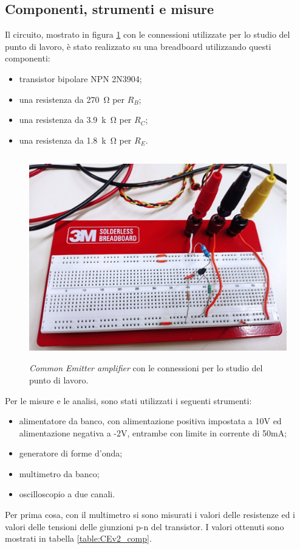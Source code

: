 \documentclass{report}
\begin{document}
\subsection{Componenti, strumenti e misure} 
Il circuito, mostrato in figura \ref{figura:fotoCEv2_pl} con le connessioni utilizzate per lo studio del punto di lavoro, è stato realizzato su una breadboard utilizzando questi componenti:
\begin{itemize}
\item transistor bipolare NPN 2N3904;
\item una resistenza da \SI{270}{\ohm} per $R_B$;
\item una resistenza da \SI{3.9}{k\ohm} per $R_C$;
\item una resistenza da \SI{1.8}{k\ohm} per $R_E$.
\end{itemize}
\begin{figure}[h]
\centering
\includegraphics[height=8.9cm]{immagini/fotoCEv2_pl}
\caption{\textit{Common Emitter amplifier} con le connessioni per lo studio del punto di lavoro.}
\label{figura:fotoCEv2_pl}
\end{figure}
Per le misure e le analisi, sono stati utilizzati i seguenti strumenti:
\begin{itemize}
\item alimentatore da banco, con alimentazione positiva impostata a 10V ed alimentazione negativa a -2V, entrambe con limite in corrente di 50mA;
\item generatore di forme d'onda;
\item multimetro da banco;
\item oscilloscopio a due canali.
\end{itemize}
Per prima cosa, con il multimetro si sono misurati i valori delle resistenze ed i valori delle tensioni delle giunzioni p-n del transistor. I valori ottenuti sono mostrati in tabella \ref{table:CEv2_comp}.
\end{document}
